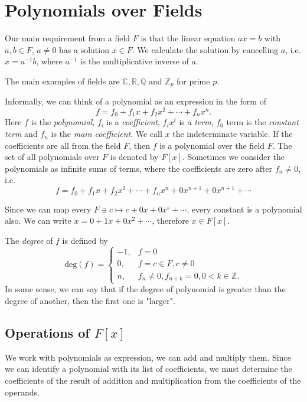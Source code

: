 \documentclass{article}
\newcommand{\Z}{\mathbb{Z}}
\begin{document}
\section{Polynomials over Fields}

Our main requirement from a field $F$ is that the linear equation $ax=b$ with $a, b \in F$, $a\neq 0$ has a solution $x \in F$.
We calculate the solution by cancelling $a$, i.e. $x=a^{-1}b$, where $a^{-1}$ is the multiplicative inverse of $a$.

The main examples of fields are $\mathbb{C}, \mathbb{R}, \mathbb{Q}$ and $\Z_p$ for prime $p$.

Informally, we can think of a polynomial as an expression in the form of
\[
    f = f_0 + f_1 x + f_2 x^2 + \cdots + f_n x^n.
\]
Here $f$ is the \emph{polynomial}, $f_i$ is a \emph{coefficient}, $f_i x^i$ is a \emph{term}, $f_0$ term is the \emph{constant term} and $f_n$ is the \emph{main coefficient}.
We call $x$ the indeterminate variable. If the coefficients are all from the field $F$, then $f$ is a polynomial over the field $F$.
The set of all polynomials over $F$ is denoted by $F[x]$. 
Sometimes we consider the polynomials as infinite sums of terms, where the coefficients are zero after $f_n \neq 0$, i.e.
\[
    f = f_0 + f_1 x + f_2 x^2 + \cdots + f_n x^n + 0x^{n+1} + 0x^{n+1} + \cdots
\]

Since we can map every $F \ni c \mapsto c + 0x + 0x^s + \cdots$, every constant is a polynomial also.
We can write $x = 0 + 1x + 0x^2 + \cdots$, therefore $x \in F[x]$.

The \emph{degree} of $f$ is defined by
\[
    \mathrm{deg}(f) = \begin{cases}
        -1, & f = 0 \\
        0, & f = c \in F, c \neq 0 \\
        n, & f_n \neq 0, f_{n+k} = 0, 0 < k \in \Z.
    \end{cases}
\]
In some sense, we can say that if the degree of polynomial is greater than the degree of another, then the first one is "larger".

\subsection{Operations of $F[x]$}

We work with polynomials as expression, we can add and multiply them.
Since we can identify a polynomial with its list of coefficients, we must determine the coefficients of the result of addition and multiplication from the coefficients of the operands.
\end{document}
